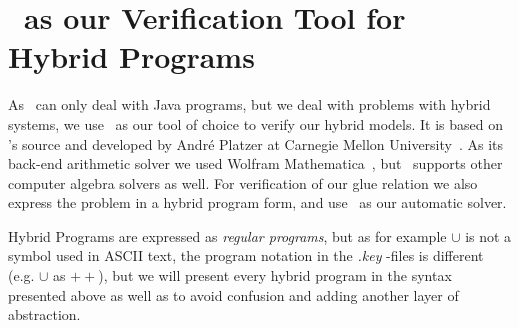 \section{\keym~as our Verification Tool for Hybrid Programs}
\label{sec:pre:key}

As \key~can only deal with Java programs, but we deal with problems with hybrid systems, we use \keym~as our tool of choice to verify our hybrid models. It is based on \key's source and developed by Andr\'e Platzer at Carnegie Mellon University~\cite{keymaera}. As its back-end arithmetic solver we used Wolfram Mathematica~\cite{mathematica}, but \keym~supports other computer algebra solvers as well. For verification of our glue relation we also express the problem in a hybrid program form, and use \keym~as our automatic solver.

Hybrid Programs are expressed as \textit{regular programs}, but as for example \(\cup\) is not a symbol used in ASCII text, the program notation in the \textit{.key} \keym-files is different (e.g. \(\cup\) as \(++\)), but we will present every hybrid program in the syntax presented above as well as to avoid confusion and adding another layer of abstraction.
